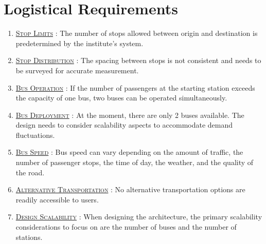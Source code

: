 \section{Logistical Requirements}

\begin{enumerate}

\item {}\underline{\textsc{Stop Limits}} : The number of stops allowed between origin and destination is predetermined by the institute's system.

\item \underline{\textsc{Stop Distribution}} : The spacing between stops is not consistent and needs to be surveyed for accurate measurement.

\item \underline{\textsc{Bus Operation}} : If the number of passengers at the starting station exceeds the capacity of one bus, two buses can be operated simultaneously.

\item \underline{\textsc{Bus Deployment}} : At the moment, there are only 2 buses available. The design needs to consider scalability aspects to accommodate demand fluctuations.

\item \underline{\textsc{Bus Speed}} : Bus speed can vary depending on the amount of traffic, the number of passenger stops, the time of day, the weather, and the quality of the road.

\item \underline{\textsc{Alternative Transportation}} : No alternative transportation options are readily accessible to users.

\item {}\underline{\textsc{Design Scalability}} : When designing the architecture, the primary scalability considerations to focus on are the number of buses and the number of stations.
\end{enumerate}